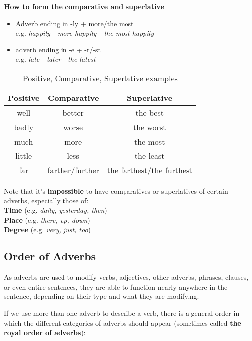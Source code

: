 \documentclass[hidelinks,10pt,a4paper]{article}
\begin{document}
\textbf{How to form the comparative and superlative}
\begin{itemize}
  \item Adverb ending in -ly + more/the most \\
e.g. \textit{happily - more happily - the most happily}

  \item adverb ending in -e + -r/-st \\
e.g. \textit{late - later - the latest}
\end{itemize}


\begin{table}[h]
\begin{center}
\begin{tabular}{|c|c|c|}
	\hline
	\textbf{Positive} & \textbf{Comparative} & \textbf{Superlative} \\ \hline
	well & better & the best \\ \hline
	badly & worse & the worst \\ \hline
	much & more & the most \\ \hline
	little & less & the least \\ \hline
	far & farther/further & the farthest/the furthest \\ \hline
\end{tabular}
\end{center}
\caption{Positive, Comparative, Superlative examples} \label{tab:csad2}
\end{table}

Note that it's \textbf{impossible} to have comparatives or superlatives of certain adverbs, especially those of:\\
\indent \textbf{Time} (e.g. \textit{daily, yesterday, then})\\
\indent \textbf{Place} (e.g. \textit{there, up, down})\\
\indent \textbf{Degree} (e.g. \textit{very, just, too})

\subsection{Order of Adverbs}
As adverbs are used to modify verbs, adjectives, other adverbs, phrases, clauses, or even entire sentences, they are able to function nearly anywhere in the sentence, depending on their type and what they are modifying.

If we use more than one adverb to describe a verb, there is a general order in which the different categories of adverbs should appear (sometimes called \textbf{the royal order of adverbs}):
\end{document}
